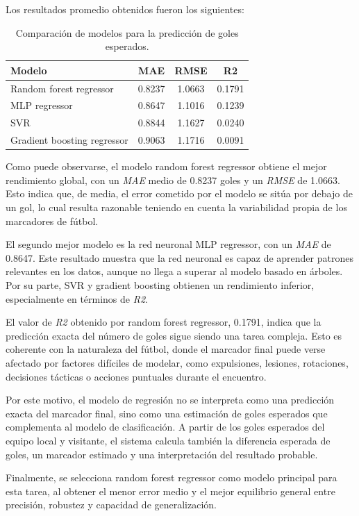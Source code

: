 Los resultados promedio obtenidos fueron los siguientes:

\begin{table}[H]
\centering
\caption{Comparación de modelos para la predicción de goles esperados.}
\label{cap: evaluacion_golesesperados}
\begin{tabular}{|l|c|c|c|}
\hline
\textbf{Modelo} & \textbf{MAE} & \textbf{RMSE} & \textbf{R2} \\
\hline
Random forest regressor & 0.8237 & 1.0663 & 0.1791 \\
\hline
MLP regressor & 0.8647 & 1.1016 & 0.1239 \\
\hline
SVR & 0.8844 & 1.1627 & 0.0240 \\
\hline
Gradient boosting regressor & 0.9063 & 1.1716 & 0.0091 \\
\hline
\end{tabular}
\end{table}

Como puede observarse, el modelo random forest regressor obtiene el mejor rendimiento global, con un \textit{MAE} medio de 0.8237 goles y un \textit{RMSE} de 1.0663. Esto indica que, de media, el error cometido por el modelo se sitúa por debajo de un gol, lo cual resulta razonable teniendo en cuenta la variabilidad propia de los marcadores
de fútbol.

El segundo mejor modelo es la red neuronal MLP regressor, con un \textit{MAE} de 0.8647. Este resultado muestra que la red neuronal es capaz de aprender patrones relevantes en los datos, aunque no llega a superar al modelo basado en árboles. Por su parte, SVR y gradient boosting obtienen un rendimiento inferior, especialmente en
términos de \textit{R2}.

El valor de \textit{R2} obtenido por random forest regressor, 0.1791, indica que la predicción exacta del número de goles sigue siendo una tarea compleja. Esto es coherente con la naturaleza del fútbol, donde el marcador final puede verse afectado por factores difíciles de modelar, como expulsiones, lesiones, rotaciones, decisiones tácticas o acciones puntuales durante el encuentro.

Por este motivo, el modelo de regresión no se interpreta como una predicción exacta del marcador final, sino como una estimación de goles esperados que complementa al modelo de clasificación. A partir de los goles esperados del equipo local y visitante, el sistema calcula también la diferencia esperada de goles, un marcador estimado y una
interpretación del resultado probable.

Finalmente, se selecciona random forest regressor como modelo principal para esta tarea, al obtener el menor error medio y el mejor equilibrio general entre precisión, robustez y capacidad de generalización.

